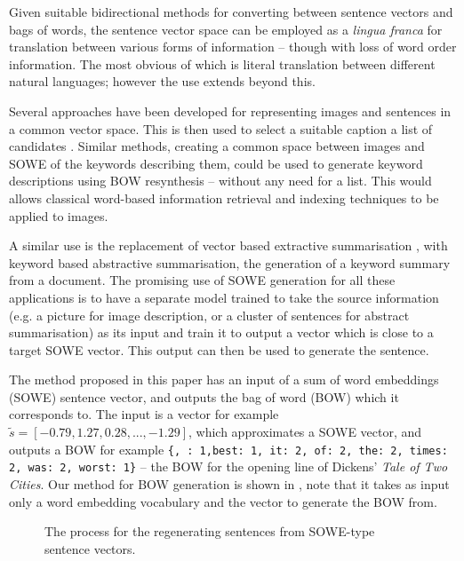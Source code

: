 \documentclass{llncs}
\begin{document}
Given suitable bidirectional methods for converting between sentence vectors and bags of words, the sentence vector space can be employed as a \emph{lingua franca} for translation between various forms of information -- though with loss of word order information. The most obvious of which is literal translation between different natural languages; however the use extends beyond this.

Several approaches have been developed for representing images and sentences in a common vector space. This is then used to select a suitable caption a list of candidates \parencite{farhadi2010every,socherDTRNN}. Similar methods, creating a common space between images and SOWE of the keywords describing them, could be used to generate keyword descriptions using BOW resynthesis -- without any need for a list. This would allows classical word-based information retrieval and indexing techniques to be applied to images.

A similar use is the replacement of vector based extractive summarisation \parencite{KaagebExtractiveSummaristation,yogatamaextractive}, with keyword based abstractive summarisation, the generation of a keyword summary from a document. The promising use of SOWE generation for all these applications is to have a separate model trained to take the source information (e.g. a picture for image description, or a cluster of sentences for abstract summarisation) as its input and train it to output a vector which is close to a target SOWE vector. This output can then be used to generate the sentence.


The method proposed in this paper has an input of a sum of word embeddings (SOWE) sentence vector, and outputs the bag of word (BOW) which it corresponds to. The input is a vector for example $\tilde{s}=[-0.79, 1.27,0.28,...,-1.29]$, which approximates a SOWE vector, and outputs a BOW for example \texttt{\{, : 1,best: 1, it: 2, of: 2, the: 2, times: 2, was: 2, worst: 1\}} -- the BOW for the opening line of Dickens' \emph{Tale of Two Cities}. Our method for BOW generation is shown in , note that it takes as input only a word embedding vocabulary and the vector to generate the BOW from. 

\begin{figure}
	\centering 
	
	\caption{The process for the regenerating sentences from SOWE-type sentence vectors.}
	\label{block_diagram}
\end{figure}
\end{document}
